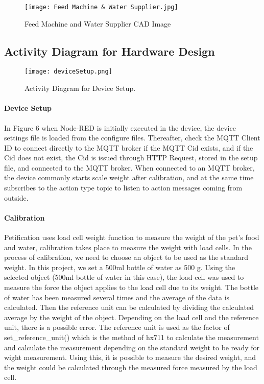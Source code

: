 \documentclass[conference]{IEEEtran}
\begin{document}
\begin{figure}[htbp]
\centerline{\texttt{[image: Feed Machine \& Water Supplier.jpg]}}
\caption{Feed Machine and Water Supplier CAD Image}
\label{fig}
\end{figure}



\subsection{Activity Diagram for Hardware Design}

\begin{figure}[htbp]
\centerline{\texttt{[image: deviceSetup.png]}}
\caption{Activity Diagram for Device Setup.}
\label{fig}
\end{figure}

\paragraph{Device Setup}
In Figure 6 when Node-RED is initially executed in the device, the device settings file is loaded from the configure files.
Thereafter, check the MQTT Client ID to connect directly to the MQTT broker if the MQTT Cid exists, and if the Cid does not exist, the Cid is issued through HTTP Request, stored in the setup file, and connected to the MQTT broker. When connected to an MQTT broker, the device commonly starts scale weight after calibration, and at the same time subscribes to the action type topic to listen to action messages coming from outside.

\paragraph{Calibration}
Petification uses load cell weight function to measure the weight of the pet’s food and water,
calibration takes place to measure the weight with load cells.
In the process of calibration, we need to choose an object to be used as the standard weight. In this project, we set a 500ml bottle of water as 500 g.
Using the selected object (500ml bottle of water in this case), the load cell was used to measure
the force the object applies to the load cell due to its weight.
The bottle of water has been measured several times and the average of the data is calculated.
Then the reference unit can be calculated by dividing the calculated average by the weight of the
object.
Depending on the load cell and the reference unit, there is a possible error.
The reference unit is used as the factor of set\_reference\_unit() which is the method of hx711 to
calculate the measurement and calculate the measurement depending on the standard weight to
be ready for wight measurement. Using this, it is possible to measure the desired weight, and the
weight could be calculated through the measured force measured by the load cell.
\end{document}
